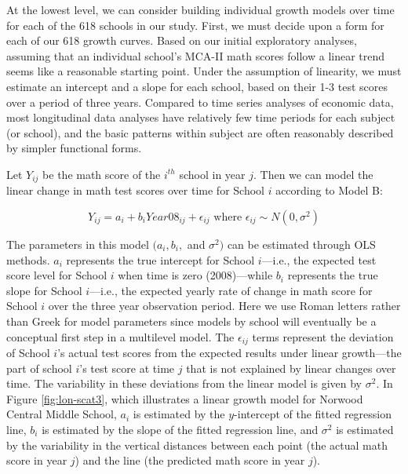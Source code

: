 \documentclass[
]{krantz}
\begin{document}
At the lowest level, we can consider building individual growth models over time for each of the 618 schools in our study. First, we must decide upon a form for each of our 618 growth curves. Based on our initial exploratory analyses, assuming that an individual school's MCA-II math scores follow a linear trend seems like a reasonable starting point. Under the assumption of linearity, we must estimate an intercept and a slope for each school, based on their 1-3 test scores over a period of three years. Compared to time series analyses of economic data, most longitudinal data analyses have relatively few time periods for each subject (or school), and the basic patterns within subject are often reasonably described by simpler functional forms.

Let \(Y_{ij}\) be the math score of the \(i^{th}\) school in year \(j\). Then we can model the linear change in math test scores over time for School \(i\) according to Model B:

\begin{equation}
Y_{ij} = a_{i} + b_{i}Year08_{ij} + \epsilon_{ij} \textrm{ where } \epsilon_{ij} \sim N(0, \sigma^2)
\end{equation}

The parameters in this model \((a_{i}, b_{i},\) and \(\sigma^2)\) can be estimated through OLS methods. \(a_{i}\) represents the true intercept for School \(i\)---i.e., the expected test score level for School \(i\) when time is zero (2008)---while \(b_{i}\) represents the true slope for School \(i\)---i.e., the expected yearly rate of change in math score for School \(i\) over the three year observation period. Here we use Roman letters rather than Greek for model parameters since models by school will eventually be a conceptual first step in a multilevel model. The \(\epsilon_{ij}\) terms represent the deviation of School \(i\)'s actual test scores from the expected results under linear growth---the part of school \(i\)'s test score at time \(j\) that is not explained by linear changes over time. The variability in these deviations from the linear model is given by \(\sigma^2\). In Figure \ref{fig:lon-scat3}, which illustrates a linear growth model for Norwood Central Middle School, \(a_{i}\) is estimated by the \(y\)-intercept of the fitted regression line, \(b_{i}\) is estimated by the slope of the fitted regression line, and \(\sigma^2\) is estimated by the variability in the vertical distances between each point (the actual math score in year \(j\)) and the line (the predicted math score in year \(j\)).
\end{document}
